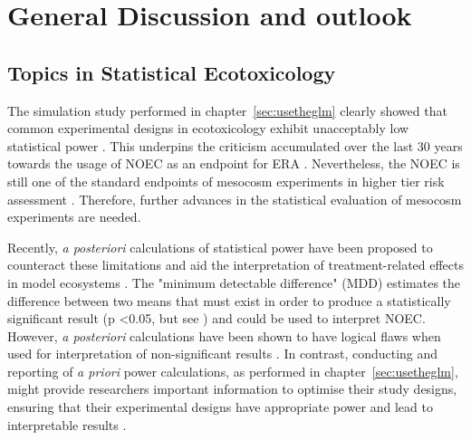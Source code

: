 
\chapter{General Discussion and outlook}
\label{sec:discussion} 

 
\section{Topics in Statistical Ecotoxicology}
The simulation study performed in chapter~\ref{sec:usetheglm} clearly showed that common experimental designs in ecotoxicology exhibit unacceptably low statistical power \citep{szocs_statistical_2016, van_der_hoeven_power_1998}.
This underpins the criticism accumulated over the last 30 years towards the usage of NOEC as an endpoint for ERA \citep{fox_comment_2016}. 
Nevertheless, the NOEC is still one of the standard endpoints of mesocosm experiments in higher tier risk assessment \citep{efsa_guidance_2013}.
Therefore, further advances in the statistical evaluation of mesocosm experiments are needed.

Recently, \emph{a posteriori} calculations of statistical power have been proposed to counteract these limitations and aid the interpretation of treatment-related effects in model ecosystems \citep{brock_minimum_2015}.
The "minimum detectable difference" (MDD) estimates the difference between two means that must exist in order to produce a statistically significant result (p \textless 0.05, but see \citet{gelman_difference_2006}) and could be used to interpret NOEC.
However, \emph{a posteriori} calculations have been shown to have logical flaws when used for interpretation of non-significant results \citep{hoenig_abuse_2001, nakagawa_case_2004}. 
In contrast, conducting and reporting of \emph{a priori} power calculations, as performed in chapter~\ref{sec:usetheglm}, might provide researchers important information to optimise their study designs, ensuring that their experimental designs have appropriate power and lead to interpretable results \citep{johnson_power_2015}.

